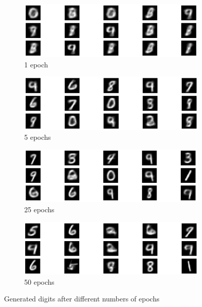 \begin{figure}[H]
    \centering
    \begin{subfigure}[b]{\textwidth}
        \centering
        \includegraphics[width=\textwidth]{images/3-generated1.png}
        \caption{1 epoch}
        \label{fig:generated1}
    \end{subfigure}
    \begin{subfigure}[b]{\textwidth}
        \centering
        \includegraphics[width=\textwidth]{images/3-generated5.png}
        \caption{5 epochs}
        \label{fig:generated5}
    \end{subfigure}
    \begin{subfigure}[b]{\textwidth}
        \centering
        \includegraphics[width=\textwidth]{images/3-generated25.png}
        \caption{25 epochs}
        \label{fig:generated25}
    \end{subfigure}
    \begin{subfigure}[b]{\textwidth}
        \centering
        \includegraphics[width=\textwidth]{images/3-generated50.png}
        \caption{50 epochs}
        \label{fig:generated50}
    \end{subfigure}
    \caption{Generated digits after different numbers of epochs}
    \label{fig:generated}
\end{figure}


